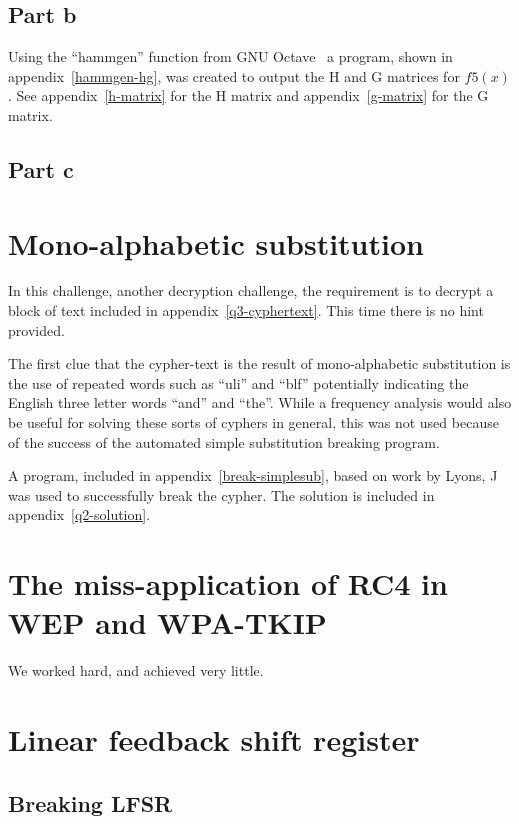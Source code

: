 \documentclass[pdftex, 12pt, a4paper]{article}
\begin{document}
\subsection{Part b}
Using the ``hammgen'' function from GNU Octave~\cite{hammgen-octave} a program, shown in appendix~\ref{hammgen-hg}, was created to output the H and G matrices for $f5(x)$. See appendix~\ref{h-matrix} for the H matrix and appendix~\ref{g-matrix} for the G matrix.


\subsection{Part c}

\section{Mono-alphabetic substitution}\label{mono}
In this challenge, another decryption challenge, the requirement is to decrypt a block of text included in appendix~\ref{q3-cyphertext}. This time there is no hint provided.

The first clue that the cypher-text is the result of mono-alphabetic substitution is the use of repeated words such as ``uli'' and ``blf'' potentially indicating the English three letter words ``and'' and ``the''. While a frequency analysis would also be useful for solving these sorts of cyphers in general, this was not used because of the success of the automated simple substitution breaking program.

A program, included in appendix~\ref{break-simplesub}, based on work by Lyons, J\cite{stochastic-searching} was used to successfully break the cypher. The solution is included in appendix~\ref{q2-solution}.

\section{The miss-application of RC4 in WEP and WPA-TKIP}\label{conclusions}
We worked hard, and achieved very little.

\pagebreak
\printbibliography

\pagebreak
\appendices
\section{Linear feedback shift register}
\subsection{Breaking LFSR}
\end{document}
